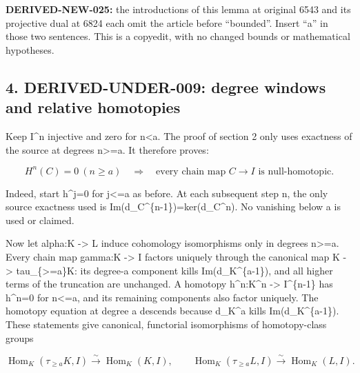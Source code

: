 \documentclass[11pt]{article}
\begin{document}
\textbf{DERIVED-NEW-025:\allowbreak{}} the introductions of this lemma at original 6543 and its projective dual at 6824 each omit the article before ``bounded''. Insert ``a'' in those two sentences. This is a copyedit,\allowbreak{} with no changed bounds or mathematical hypotheses.

\subsection{\texorpdfstring{4. DERIVED-UNDER-009:\allowbreak{} degree windows and relative homotopies}{4.  degree windows and relative homotopies}}\label{proofs-6209-7089-derived-under-009-degree-windows-and-relative-homotopies}

Keep I\^{}n injective and zero for n\textless a. The proof of section 2 only uses exactness of the source at degrees n>\allowbreak{}=a. It therefore proves:\allowbreak{}

\[
 H^n(C)=0\ (n\ge a)
 \quad\Longrightarrow\quad
 \text{every chain map }C\longrightarrow I
                    \text{ is null-homotopic}.          \tag{4.1}
\]

Indeed,\allowbreak{} start h\textasciicircum{}j\allowbreak{}=0 for j<\allowbreak{}=a as before. At each subsequent step n,\allowbreak{} the only source exactness used is Im(d\_\allowbreak{}C\textasciicircum{}\{n-1\})\allowbreak{}\allowbreak{}=ker(d\_\allowbreak{}C\textasciicircum{}n)\allowbreak{}. No vanishing below a is used or claimed.

Now let alpha:\allowbreak{}K \allowbreak{}-> L induce cohomology isomorphisms only in degrees n>\allowbreak{}=a. Every chain map gamma:\allowbreak{}K \allowbreak{}-> I factors uniquely through the canonical map K \allowbreak{}-> tau\_\allowbreak{}\{>\allowbreak{}=a\}K:\allowbreak{} its degree-a component kills Im(d\_\allowbreak{}K\textasciicircum{}\{a-1\})\allowbreak{},\allowbreak{} and all higher terms of the truncation are unchanged. A homotopy h\textasciicircum{}n:\allowbreak{}K\textasciicircum{}n \allowbreak{}-> I\^{}\{n-1\} has h\textasciicircum{}n\allowbreak{}=0 for n<\allowbreak{}=a,\allowbreak{} and its remaining components also factor uniquely. The homotopy equation at degree a descends because d\_\allowbreak{}K\textasciicircum{}a kills Im(d\_\allowbreak{}K\textasciicircum{}\{a-1\})\allowbreak{}. These statements give canonical,\allowbreak{} functorial isomorphisms of homotopy-class groups

\[
 \operatorname{Hom}_K(\tau_{\ge a}K,I)
       \xrightarrow{\sim}\operatorname{Hom}_K(K,I),
 \qquad
 \operatorname{Hom}_K(\tau_{\ge a}L,I)
       \xrightarrow{\sim}\operatorname{Hom}_K(L,I).        \tag{4.2}
\]
\end{document}

